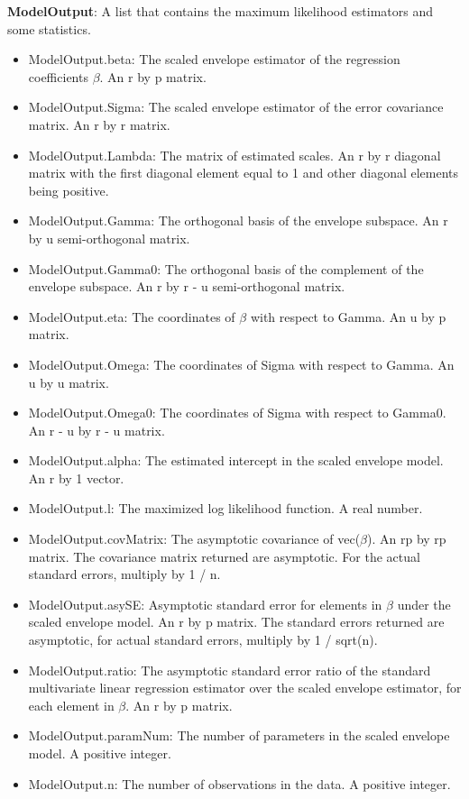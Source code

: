 \documentclass[a4paper,11pt,openany]{memoir}
\begin{document}
\begin{par}
\textbf{ModelOutput}: A list that contains the maximum likelihood estimators and some statistics.
\end{par} \vspace{1em}
\begin{itemize}
\setlength{\itemsep}{-1ex}
   \item ModelOutput.beta: The scaled envelope estimator of the regression coefficients $\beta$. An r by p matrix.
   \item ModelOutput.Sigma: The scaled envelope estimator of the error covariance matrix.  An r by r matrix.
   \item ModelOutput.Lambda: The matrix of estimated scales. An r by r diagonal matrix with the first diagonal element equal to 1 and other diagonal elements being positive.
   \item ModelOutput.Gamma: The orthogonal basis of the envelope subspace. An r by u semi-orthogonal matrix.
   \item ModelOutput.Gamma0: The orthogonal basis of the complement of the envelope subspace.  An r by r - u semi-orthogonal matrix.
   \item ModelOutput.eta: The coordinates of $\beta$ with respect to Gamma. An u by p matrix.
   \item ModelOutput.Omega: The coordinates of Sigma with respect to Gamma. An u by u matrix.
   \item ModelOutput.Omega0: The coordinates of Sigma with respect to Gamma0. An r - u by r - u matrix.
   \item ModelOutput.alpha: The estimated intercept in the scaled envelope model.  An r by 1 vector.
   \item ModelOutput.l: The maximized log likelihood function.  A real number.
   \item ModelOutput.covMatrix: The asymptotic covariance of vec($\beta$).  An rp by rp matrix.  The covariance matrix returned are asymptotic.  For the actual standard errors, multiply by 1 / n.
   \item ModelOutput.asySE: Asymptotic standard error for elements in $\beta$ under the scaled envelope model.  An r by p matrix.  The standard errors returned are asymptotic, for actual standard errors, multiply by 1 / sqrt(n).
   \item ModelOutput.ratio: The asymptotic standard error ratio of the standard multivariate linear regression estimator over the scaled envelope estimator, for each element in $\beta$.  An r by p matrix.
   \item ModelOutput.paramNum: The number of parameters in the scaled envelope model.  A positive integer.
   \item ModelOutput.n: The number of observations in the data.  A positive integer.
\end{itemize}
\end{document}
